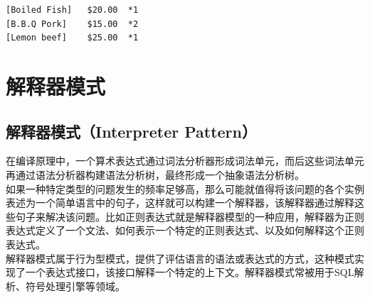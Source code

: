 \begin{tcolorbox}
    \begin{verbatim}
[Boiled Fish]	$20.00	*1
[B.B.Q Pork]	$15.00	*2
[Lemon beef]	$25.00	*1
\end{verbatim}
\end{tcolorbox}

\newpage

\section{解释器模式}

\subsection{解释器模式（Interpreter Pattern）}

在编译原理中，一个算术表达式通过词法分析器形成词法单元，而后这些词法单元再通过语法分析器构建语法分析树，最终形成一个抽象语法分析树。\\

如果一种特定类型的问题发生的频率足够高，那么可能就值得将该问题的各个实例表述为一个简单语言中的句子，这样就可以构建一个解释器，该解释器通过解释这些句子来解决该问题。比如正则表达式就是解释器模型的一种应用，解释器为正则表达式定义了一个文法、如何表示一个特定的正则表达式、以及如何解释这个正则表达式。\\

解释器模式属于行为型模式，提供了评估语言的语法或表达式的方式，这种模式实现了一个表达式接口，该接口解释一个特定的上下文。解释器模式常被用于SQL解析、符号处理引擎等领域。\\

\\

